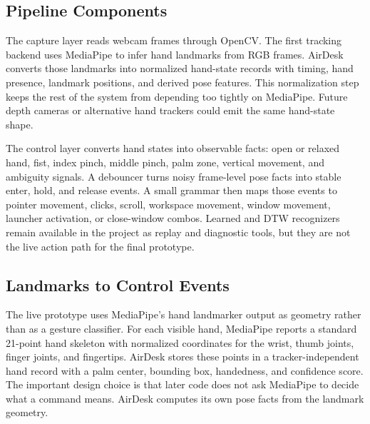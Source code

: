 \documentclass[manuscript]{acmart}
\begin{document}
\subsection{Pipeline Components}

The capture layer reads webcam frames through OpenCV. The first tracking backend uses MediaPipe to infer hand landmarks from RGB frames. AirDesk converts those landmarks into normalized hand-state records with timing, hand presence, landmark positions, and derived pose features. This normalization step keeps the rest of the system from depending too tightly on MediaPipe. Future depth cameras or alternative hand trackers could emit the same hand-state shape.

The control layer converts hand states into observable facts: open or relaxed hand, fist, index pinch, middle pinch, palm zone, vertical movement, and ambiguity signals. A debouncer turns noisy frame-level pose facts into stable enter, hold, and release events. A small grammar then maps those events to pointer movement, clicks, scroll, workspace movement, window movement, launcher activation, or close-window combos. Learned and DTW recognizers remain available in the project as replay and diagnostic tools, but they are not the live action path for the final prototype.

\subsection{Landmarks to Control Events}

The live prototype uses MediaPipe's hand landmarker output as geometry rather than as a gesture classifier. For each visible hand, MediaPipe reports a standard 21-point hand skeleton with normalized coordinates for the wrist, thumb joints, finger joints, and fingertips. AirDesk stores these points in a tracker-independent hand record with a palm center, bounding box, handedness, and confidence score. The important design choice is that later code does not ask MediaPipe to decide what a command means. AirDesk computes its own pose facts from the landmark geometry.
\end{document}
